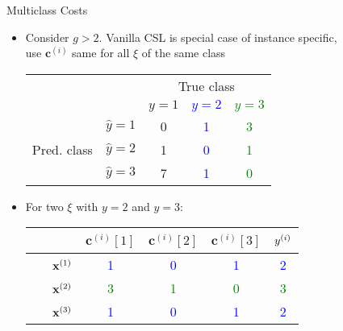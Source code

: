 \documentclass[11pt,compress,t,notes=noshow, xcolor=table]{beamer}
\newcommand{\cv}{\mathbf{c}}    %
\begin{document}
\begin{vbframe}{Multiclass Costs}
    \begin{itemize}

        \item Consider $g > 2$. Vanilla CSL is special case of instance specific,\\use $\cv^{(i)}$ same for all $\xi$ of the same class
        
        \vspace{5pt}
        \begin{center}
                            \begin{tabular}{cc|ccc}
        			& &\multicolumn{3}{c}{True class} \\
        			& & $y=1$ & \textcolor{blue}{$y=2$} & \textcolor{green}{$y=3$}  \\
        			\hline
        			\multirow{3}{*}{\parbox{0.6cm}{Pred.  class}} & $\hat y=1$ & 0 & \textcolor{blue}{1} & \textcolor{green}{3}\\
        			& $\hat y=2$ & 1 & \textcolor{blue}{0} & \textcolor{green}{1}\\
                        & $\hat y=3$ & 7 & \textcolor{blue}{1} & \textcolor{green}{0}\\
                \end{tabular}
        \end{center}
        \vspace{5pt}
        
        \item For two $\xi$ with $y=2$ and $y = 3$: %
                \vspace{5pt}

                \begin{center}
                            \begin{tabular}{cc|cccc}\
        			& & $\cv^{(i)}[1]$ & $\cv^{(i)}[2]$ & $\cv^{(i)}[3]$ & $y^{(i)}$ \\
        			\hline & $\mathbf{x}^{(1)}$ & \textcolor{blue}{1} & \textcolor{blue}{0} & \textcolor{blue}{1} & \textcolor{blue}{2}\\
        			& $\mathbf{x}^{(2)}$ & \textcolor{green}{3} & \textcolor{green}{1} & \textcolor{green}{0} & \textcolor{green}{3}\\
                        & $\mathbf{x}^{(3)}$ & \textcolor{blue}{1} & \textcolor{blue}{0} & \textcolor{blue}{1} & \textcolor{blue}{2}\\
                \end{tabular}
        \end{center}
                \vspace{5pt}


\end{itemize}
\end{vbframe}
\end{document}
